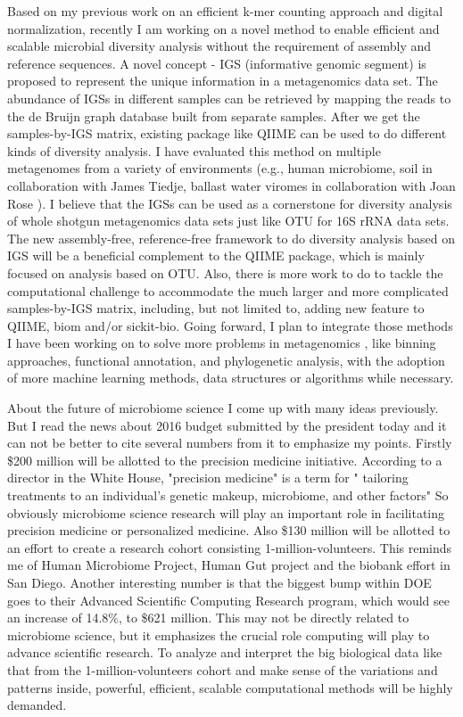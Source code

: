 \documentclass[10pt,a4paper,sans]{moderncv}        %
\begin{document}
Based on my previous work on an efficient k-mer counting approach and digital normalization, 
recently I am working on a novel method to enable efficient and scalable microbial diversity 
analysis  without the requirement of assembly and reference sequences. A novel concept - IGS
 (informative genomic segment) is proposed to represent the unique information in a metagenomics 
 data set.  The abundance of IGSs in different samples can be retrieved by mapping the reads to 
 the de Bruijn graph database built from separate samples. After we get the samples-by-IGS 
 matrix, existing package like QIIME can be used to do different kinds of diversity analysis. I have 
 evaluated this method on multiple metagenomes from a variety of environments (e.g., human 
 microbiome,  soil in collaboration with James Tiedje, ballast water viromes in 
 collaboration with Joan Rose ). I believe that the IGSs can be used as a cornerstone for diversity 
 analysis of whole shotgun metagenomics data sets just like OTU for 16S rRNA data sets. The new assembly-free, 
 reference-free framework to do diversity analysis based on IGS will be a beneficial complement 
 to the QIIME package, which is mainly focused on analysis based on OTU.  Also, there is more 
 work to do to tackle the computational challenge to accommodate the much larger and more 
 complicated samples-by-IGS matrix, including, but not limited to, adding new feature to QIIME, 
 biom and/or sickit-bio.   Going forward, I plan to integrate those methods I have been working 
 on to solve more problems in metagenomics , like binning approaches, functional annotation, 
 and phylogenetic analysis, with the adoption of more machine learning methods, data structures 
 or algorithms while necessary.

About the future of microbiome science I come up with many ideas previously. But I read the news 
about  2016 budget submitted by the president today and it can not be better to cite several numbers
 from it to emphasize my points. Firstly \$200 million will be allotted to the precision medicine 
 initiative. According to a director in the White House, "precision medicine" is a term for " tailoring 
 treatments to an individual's genetic makeup, microbiome, and other factors"  So obviously 
 microbiome science research will play an important role in facilitating precision medicine or 
 personalized medicine.  Also \$130 million will be allotted to an effort to create a research cohort 
 consisting 1-million-volunteers. This reminds me of Human Microbiome Project, Human Gut 
 project and the biobank effort in San Diego. Another interesting number is that the biggest bump 
 within DOE goes to their Advanced Scientific Computing Research program, which would see an 
 increase of 14.8\%, to \$621 million. This may not be directly related to microbiome science, but 
 it emphasizes the crucial role computing will play to advance scientific research. To analyze and 
 interpret the big biological data like that from the 1-million-volunteers cohort and make sense of 
 the variations and patterns inside, powerful, efficient, scalable computational methods will be 
 highly demanded. 
\end{document}
